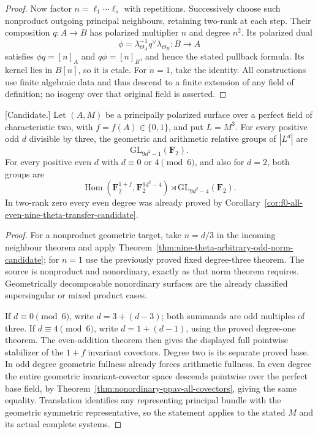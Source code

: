 \begin{proof}
Now factor $n=\ell_1\cdots\ell_s$ with repetitions. Successively
choose such nonproduct outgoing principal neighbours, retaining
two-rank at each step. Their composition $q:A\to B$ has polarized
multiplier $n$ and degree $n^2$. Its polarized dual
\[
           \phi=\lambda_{\Theta_A}^{-1}q^\vee\lambda_{\Theta_B}
                     :B\longrightarrow A
\]
satisfies $\phi q=[n]_A$ and $q\phi=[n]_B$, and hence the stated
pullback formula. Its kernel lies in $B[n]$, so it is etale.
For $n=1$, take the identity. All constructions use finite algebraic
data and thus descend to a finite extension of any field of
definition; no isogeny over that original field is asserted.
\end{proof}

\begin{corollary}
\label{cor:nonordinary-all-odd-multiples-three-candidate}
\textup{[Candidate.]}
Let $(A,M)$ be a principally polarized surface over a perfect field
of characteristic two, with $f=f(A)\in\{0,1\}$, and put $L=M^3$.
For every positive odd $d$ divisible by three, the geometric and
arithmetic relative groups of $|L^d|$ are
\[
                         \mathrm{GL}_{9d^2-1}(\mathbf F_2).
\]
For every positive even $d$ with $d\equiv0$ or $4\pmod6$, and also
for $d=2$, both groups are
\[
 \operatorname{Hom}(\mathbf F_2^{1+f},\mathbf F_2^{9d^2-4})
                  \rtimes\mathrm{GL}_{9d^2-4}(\mathbf F_2).
\]
In two-rank zero every even degree was already proved by
Corollary~\ref{cor:f0-all-even-nine-theta-transfer-candidate}.
\end{corollary}

\begin{proof}
For a nonproduct geometric target, take $n=d/3$ in the incoming
neighbour theorem and apply
Theorem~\ref{thm:nine-theta-arbitrary-odd-norm-candidate}; for $n=1$
use the previously proved fixed degree-three theorem. The source
is nonproduct and nonordinary, exactly as that norm theorem requires.
Geometrically decomposable nonordinary surfaces are the already
classified supersingular or mixed product cases.

If $d\equiv0\pmod6$, write $d=3+(d-3)$; both summands are odd
multiples of three. If $d\equiv4\pmod6$, write $d=1+(d-1)$,
using the proved degree-one theorem. The even-addition theorem
then gives the displayed full pointwise stabilizer of the
$1+f$ invariant covectors. Degree two is its separate proved base.
In odd degree geometric fullness already forces arithmetic
fullness. In even degree the entire geometric invariant-covector space
descends pointwise over the perfect base field, by
Theorem~\ref{thm:nonordinary-ppav-all-covectors}, giving the
same equality. Translation
identifies any representing principal bundle with the geometric
symmetric representative, so the statement applies to the stated
$M$ and its actual complete systems.
\end{proof}

